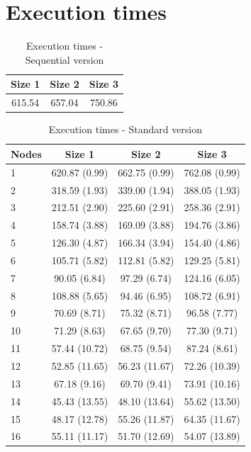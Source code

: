 \documentclass{article}
\begin{document}
\section{Execution times}

\begin{table}[H]
\centering
\begin{tabular}{|c|c|c|}
\hline
Size 1 & Size 2 & Size 3 \\
\hline
615.54 & 657.04 & 750.86 \\
\hline
\end{tabular}
\caption{Execution times - Sequential version} \label{tab:sequentialtimes}
\end{table}

\begin{table}[H]
\centering
\begin{tabular}{|l|c|c|c|}
\hline
Nodes & Size 1 & Size 2 & Size 3 \\ \hline
1 & 620.87 (0.99) & 662.75 (0.99) & 762.08 (0.99) \\ \hline
2 & 318.59 (1.93) & 339.00 (1.94) & 388.05 (1.93) \\ \hline
3 & 212.51 (2.90) & 225.60 (2.91) & 258.36 (2.91) \\ \hline
4 & 158.74 (3.88) & 169.09 (3.88) & 194.76 (3.86) \\ \hline
5 & 126.30 (4.87) & 166.34 (3.94) & 154.40 (4.86) \\ \hline
6 & 105.71 (5.82) & 112.81 (5.82) & 129.25 (5.81) \\ \hline
7 & 90.05 (6.84) & 97.29 (6.74) & 124.16 (6.05) \\ \hline
8 & 108.88 (5.65) & 94.46 (6.95) & 108.72 (6.91) \\ \hline
9 & 70.69 (8.71) & 75.32 (8.71) & 96.58 (7.77) \\ \hline
10 & 71.29 (8.63) & 67.65 (9.70) & 77.30 (9.71) \\ \hline
11 & 57.44 (10.72) & 68.75 (9.54) & 87.24 (8.61) \\ \hline
12 & 52.85 (11.65) & 56.23 (11.67) & 72.26 (10.39) \\ \hline
13 & 67.18 (9.16) & 69.70 (9.41) & 73.91 (10.16) \\ \hline
14 & 45.43 (13.55) & 48.10 (13.64) & 55.62 (13.50) \\ \hline
15 & 48.17 (12.78) & 55.26 (11.87) & 64.35 (11.67) \\ \hline
16 & 55.11 (11.17) & 51.70 (12.69) & 54.07 (13.89) \\ \hline
\end{tabular}
\caption{Execution times - Standard version} \label{tab:standardtimes}
\end{table}
\end{document}
